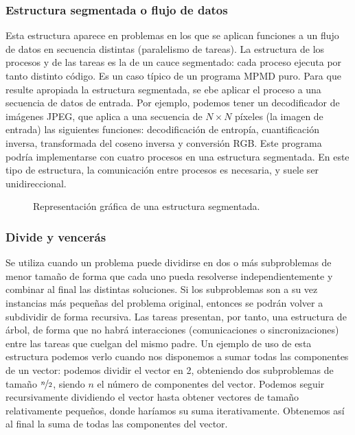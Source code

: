 \subsubsection{Estructura segmentada o flujo de datos} 
Esta estructura aparece en problemas en los que se aplican funciones a un flujo de datos en secuencia distintas (paralelismo de tareas). La estructura de los procesos y de las tareas es la de un cauce segmentado: cada proceso ejecuta por tanto distinto código. Es un caso típico de un programa MPMD puro. Para que resulte apropiada la estructura segmentada, se ebe aplicar el proceso a una secuencia de datos de entrada.
Por ejemplo, podemos tener un decodificador de imágenes JPEG, que aplica a una secuencia de $N\times N$ píxeles (la imagen de entrada) las siguientes funciones: decodificación de entropía, cuantificación inversa, transformada del coseno inversa y conversión RGB\@. Este programa podría implementarse con cuatro procesos en una estructura segmentada.
En este tipo de estructura, la comunicación entre procesos es necesaria, y suele ser unidireccional.
\begin{figure}[H]
\centering
{}
\caption{Representación gráfica de una estructura segmentada.}
\label{graph:estructura_segmentada}
\end{figure}

\subsubsection{Divide y vencerás} 
Se utiliza cuando un problema puede dividirse en dos o más subproblemas de menor tamaño de forma que cada uno pueda resolverse independientemente y combinar al final las distintas soluciones. Si los subproblemas son a su vez instancias más pequeñas del problema original, entonces se podrán volver a subdividir de forma recursiva. Las tareas presentan, por tanto, una estructura de árbol, de forma que no habrá interacciones (comunicaciones o sincronizaciones) entre las tareas que cuelgan del mismo padre.
Un ejemplo de uso de esta estructura podemos verlo cuando nos disponemos a sumar todas las componentes de un vector: podemos dividir el vector en 2, obteniendo dos subproblemas de tamaño $ \nicefrac{n}{2} $, siendo $n$ el número de componentes del vector. Podemos seguir recursivamente dividiendo el vector hasta obtener vectores de tamaño relativamente pequeños, donde haríamos su suma iterativamente. Obtenemos así al final la suma de todas las componentes del vector.

